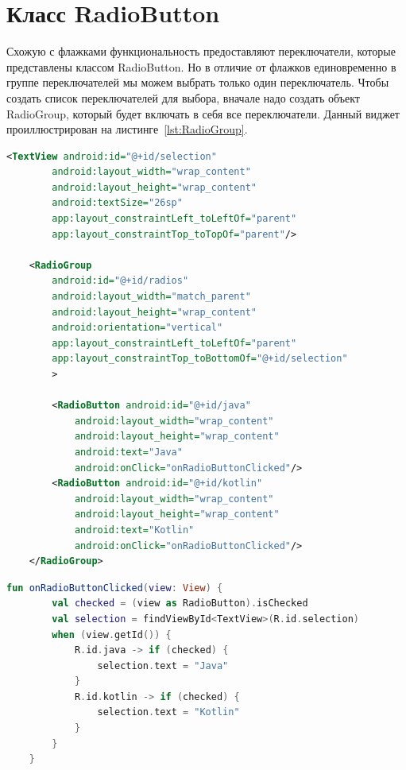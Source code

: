 \section{Класс RadioButton}
Схожую с флажками функциональность предоставляют 
переключатели, которые представлены классом RadioButton. Но в отличие от 
флажков единовременно в группе переключателей мы можем выбрать только 
один переключатель. Чтобы создать список переключателей для выбора, 
вначале надо создать объект RadioGroup, который будет включать в себя все 
переключатели.
Данный виджет проиллюстрирован на листинге~\ref{lst:RadioGroup}.
\begin{lstlisting}[language=xml, caption=\leftline{RadioGroup XML}, label=lst:RadioGroup]
<TextView android:id="@+id/selection"
        android:layout_width="wrap_content"
        android:layout_height="wrap_content"
        android:textSize="26sp"
        app:layout_constraintLeft_toLeftOf="parent"
        app:layout_constraintTop_toTopOf="parent"/>

    <RadioGroup
        android:id="@+id/radios"
        android:layout_width="match_parent"
        android:layout_height="wrap_content"
        android:orientation="vertical"
        app:layout_constraintLeft_toLeftOf="parent"
        app:layout_constraintTop_toBottomOf="@+id/selection"
        >

        <RadioButton android:id="@+id/java"
            android:layout_width="wrap_content"
            android:layout_height="wrap_content"
            android:text="Java"
            android:onClick="onRadioButtonClicked"/>
        <RadioButton android:id="@+id/kotlin"
            android:layout_width="wrap_content"
            android:layout_height="wrap_content"
            android:text="Kotlin"
            android:onClick="onRadioButtonClicked"/>
    </RadioGroup>
\end{lstlisting}

\begin{lstlisting}[language=Kotlin, caption=\leftline{RadioGroup Kotlin}, label=lst:RadioGroupKotlin]
fun onRadioButtonClicked(view: View) {
        val checked = (view as RadioButton).isChecked
        val selection = findViewById<TextView>(R.id.selection)
        when (view.getId()) {
            R.id.java -> if (checked) {
                selection.text = "Java"
            }
            R.id.kotlin -> if (checked) {
                selection.text = "Kotlin"
            }
        }
    }
\end{lstlisting}

